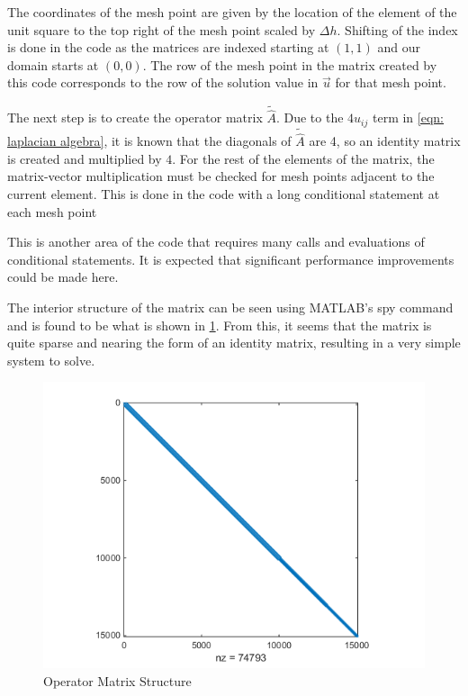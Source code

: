 \documentclass[10pt,a4paper]{article}
\begin{document}
The coordinates of the mesh point are given by the location of the element of the unit square to the top right of the mesh point scaled by $\Delta h$. Shifting of the index is done in the code as the matrices are indexed starting at $(1,1)$ and our domain starts at $(0,0)$. The row of the mesh point in the matrix created by this code corresponds to the row of the solution value in $\vec{u}$ for that mesh point.

The next step is to create the operator matrix $\tilde{\hat{A}}$. Due to the $4u_{ij}$ term in \cref{eqn: laplacian algebra}, it is known that the diagonals of $\tilde{\hat{A}}$ are 4, so an identity matrix is created and multiplied by $4$. For the rest of the elements of the matrix, the matrix-vector multiplication must be checked for mesh points adjacent to the current element. This is done in the code with a long conditional statement at each mesh point

\pagebreak


This is another area of the code that requires many calls and evaluations of conditional statements. It is expected that significant performance improvements could be made here.

The interior structure of the matrix can be seen using MATLAB's spy command and is found to be what is shown in \cref{fig: operator matrix}. From this, it seems that the matrix is quite sparse and nearing the form of an identity matrix, resulting in a very simple system to solve.

\begin{figure}[H]
\center
\includegraphics[scale=0.5]{figures/operator-spy.png}
\caption{Operator Matrix Structure}
\label{fig: operator matrix}
\end{figure}
\end{document}
